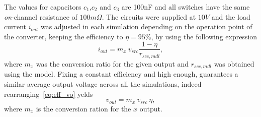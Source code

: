 The values for capacitors $c_1$,$c_2$ and $c_3$ are 100nF and all switches have the same \emph{on}-channel resistance of $100m\Omega$. The circuits were supplied at $10V$ and the load current $i_{out}$ was adjusted in each simulation depending on the operation point of the converter, keeping the efficiency to $\eta=95\%$, by using the following expression
\begin{equation}
    i_{out}=m_x~v_{src}\frac{1-\eta}{r_{scc,mdl}},
\label{eq:iout_eff}
\end{equation}
where $m_x$ was the conversion ratio for the given output and $r_{scc,mdl}$ was obtained using the model. Fixing a constant efficiency and high enough, guarantees a similar average output voltage across all the simulations, indeed rearranging~\eqref{eq:eff_vo} yelds
\begin{equation}
    v_{out}=m_x~v_{src}~\eta,
\label{eq:vout_eff}
\end{equation}
where $m_x$ is the conversion ration for the $x$ output.
\clearpage
